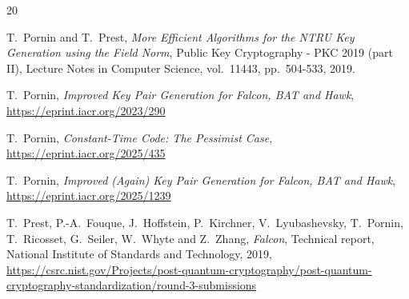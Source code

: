 \documentclass{llncs}
\begin{document}
\begin{thebibliography}{20}




T.~Pornin and T.~Prest,
\emph{More Efficient Algorithms for the NTRU Key Generation using the
Field Norm},
Public Key Cryptography - PKC 2019 (part II), Lecture Notes in Computer
Science, vol.~11443, pp.~504-533, 2019.

T.~Pornin,
\emph{Improved Key Pair Generation for Falcon, BAT and Hawk},\\
\url{https://eprint.iacr.org/2023/290}

T.~Pornin,
\emph{Constant-Time Code: The Pessimist Case},\\
\url{https://eprint.iacr.org/2025/435}

T.~Pornin,
\emph{Improved (Again) Key Pair Generation for Falcon, BAT and Hawk},\\
\url{https://eprint.iacr.org/2025/1239}

T.~Prest, P.-A.~Fouque, J.~Hoffstein, P.~Kirchner,
V.~Lyubashevsky, T.~Pornin, T.~Ricosset, G.~Seiler, W.~Whyte and Z.~Zhang,
\emph{Falcon},
Technical report, National Institute of Standards and Technology, 2019,
\url{https://csrc.nist.gov/Projects/post-quantum-cryptography/post-quantum-cryptography-standardization/round-3-submissions}




\end{thebibliography}
\end{document}
